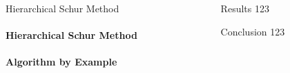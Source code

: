 \documentclass[final]{beamer}
\newlength{\sepwid}
\newlength{\onecolwid}
\begin{document}
\begin{frame}[t]
\begin{columns}[t]
\begin{column}{\onecolwid}
\begin{block}{Hierarchical Schur Method}
          \paragraph{\textbf{Hierarchical Schur Method}}


          \paragraph{\textbf{Algorithm by Example}}
        \end{block}
      \end{column}
      
      \begin{column}{\sepwid}\end{column}
      
      \begin{column}{\onecolwid}
        \begin{block}{Results}
          123
        \end{block}
        \begin{block}{Conclusion}
          123
        \end{block}
      \end{column}

      \begin{column}{\sepwid}\end{column}
    \end{columns}
  \end{frame}
\end{document}
